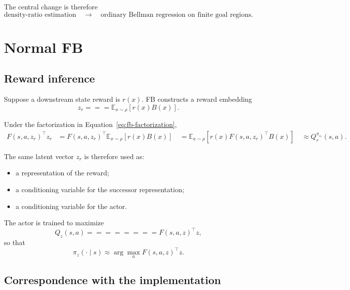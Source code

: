 \documentclass[10pt]{article}
\newcommand{\E}{\mathbb{E}}
\begin{document}
The central change is therefore
\begin{equation}
\boxed{
\text{density-ratio estimation}
\quad\longrightarrow\quad
\text{ordinary Bellman regression on finite goal regions}.
}
\end{equation}

\section{Normal FB}

\subsection{Reward inference}

Suppose a downstream state reward is $r(x)$.
FB constructs a reward embedding
\begin{equation}
z_r
===

\E_{x\sim\rho}
\left[
r(x)B(x)
\right].
\label{eq:reward-embedding}
\end{equation}

Under the factorization in Equation~\eqref{eq:fb-factorization},
\begin{align}
F(s,a,z_r)^\top z_r
&=
F(s,a,z_r)^\top
\E_{x\sim\rho}
\left[
r(x)B(x)
\right]
\
&=
\E_{x\sim\rho}
\left[
r(x)
F(s,a,z_r)^\top B(x)
\right]
\
&\approx
Q_r^{\pi_{z_r}}(s,a).
\end{align}

The same latent vector $z_r$ is therefore used as:
\begin{itemize}
\item a representation of the reward;
\item a conditioning variable for the successor representation;
\item a conditioning variable for the actor.
\end{itemize}

The actor is trained to maximize
\begin{equation}
Q_z(s,a)
========

F(s,a,z)^\top z,
\label{eq:fb-q}
\end{equation}
so that
\begin{equation}
\pi_z(\cdot\mid s)
\approx
\arg\max_a F(s,a,z)^\top z.
\end{equation}

\subsection{Correspondence with the implementation}
\end{document}
